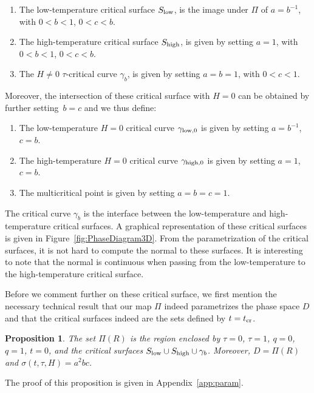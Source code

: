\documentclass[10pt,a4paper]{amsart}
\numberwithin{equation}{section}
\newtheorem{Proposition}[Theorem]{Proposition}
 { \theoremstyle{definition}
\newtheorem{Definition}[Theorem]{Definition}
\newtheorem{Note}[Theorem]{Note}
\newtheorem{Example}[Theorem]{Example}
\newtheorem{Remark}[Theorem]{Remark} }
\begin{document}
 \begin{Definition} \label{defn:criticalsurfaces} \quad
 \begin{enumerate}\itemsep=0pt
 \item[$(1)$] The low-temperature critical surface $S_{{\rm low}}$, is the image under $\Pi$ of ${a=b^{-1}}$, with $0<b <1$, $0<c<b$.
 \item[$(2)$] The high-temperature critical surface $S_{{\rm high}}$, is given by setting $a=1$, with $0 < b < 1$, $0< c < b$.
 \item[$(3)$] The $H\neq 0$ $\tau$-critical curve $\gamma_b$, is given by setting $a=b=1$, with $0 < c <1$.
 \end{enumerate}
 Moreover, the intersection of these critical surface with $H=0$ can be obtained by further setting~${b=c}$ and we thus define:
 \begin{enumerate}\itemsep=0pt
 \item[$(4)$] The low-temperature $H=0$ critical curve $\gamma_{{\rm low},0}$ is given by setting $a=b^{-1}$, $c=b$.
 \item[$(5)$] The high-temperature $H=0$ critical curve $\gamma_{{\rm high},0}$ is given by setting $a=1$, $c=b$.
 \item[$(6)$] The multicritical point is given by setting $a = b = c = 1$.
 \end{enumerate}
 \end{Definition}
 The critical curve $\gamma_b$ is the interface between the low-temperature and high-temperature critical surfaces. A graphical representation of these critical surfaces is given in Figure~\ref{fig:PhaseDiagram3D}. From the parametrization of the critical surfaces, it is not hard to compute the normal to these surfaces. It is interesting to note that the normal is continuous when passing from the low-temperature to the high-temperature critical surface.

 Before we comment further on these critical surface, we first mention the necessary technical result that our map $\Pi$ indeed parametrizes the phase space $ D$ and that the critical surfaces indeed are the sets defined by $t=t_{\rm cr}$.

 \begin{Proposition} \label{prop:phase} The set $\Pi(R)$ is the region enclosed by $\tau=0$, $\tau=1$, $q=0$, $q=1$, $t=0$, and the critical surfaces $S_{{\rm low}}\cup S_{{\rm high}}\cup \gamma_b$. Moreover, $D=\Pi(R)$ and $\sigma(t,\tau,H)=a^2bc$.
 \end{Proposition}
 The proof of this proposition is given in Appendix~\ref{app:param}.
\end{document}
